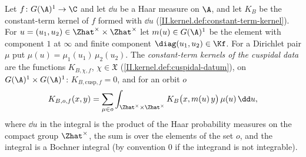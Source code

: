 Let $f\colon G(\A)^1\to\C$ and let $\dd u$ be a Haar measure on $\A$, and let $K_B$ be the constant-term kernel of $f$ formed with $\dd u$
(\cref{II.kernel.def:constant-term-kernel}). For $u=(u_1,u_2)\in\Zhat^\times\times\Zhat^\times$ let $m(u)\in G(\A)^1$ be the element with component $1$ at
$\infty$ and finite component $\diag(u_1,u_2)\in\Kf$. For a Dirichlet pair $\mu$ put $\mu(u)=\mu_1(u_1)\,\mu_2(u_2)$. The \emph{constant-term kernels of the cuspidal
data} are the functions $K_{B,\chi,f}$, $\chi\in\mathfrak X$ (\cref{II.kernel.def:cuspidal-datum}), on $G(\A)^1\times G(\A)^1$: $K_{B,\mathrm{cusp},f}=0$, and for an
orbit $o$
\[
  K_{B,o,f}(x,y)=\sum_{\mu\in o}\int_{\Zhat^\times\times\Zhat^\times}K_B\bigl(x,m(u)\,y\bigr)\,\mu(u)\,\dd u ,
\]
where $\dd u$ in the integral is the product of the Haar probability measures on the compact group $\Zhat^\times$, the sum is over the elements of the set $o$, and
the integral is a Bochner integral (by convention $0$ if the integrand is not integrable).
